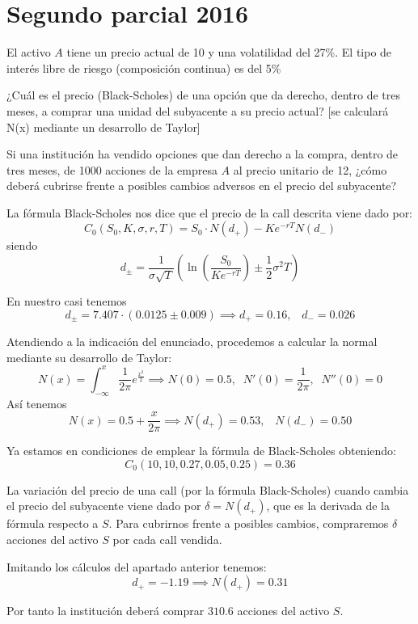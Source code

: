 \section{Segundo parcial 2016}
\begin{problem}[1]
El activo $A$ tiene un precio actual de 10 y una volatilidad del 27\%. El tipo de interés libre de riesgo (composición continua) es del 5\%

\ppart ¿Cuál es el precio (Black-Scholes) de una opción que da derecho, dentro de tres meses, a comprar una unidad del subyacente a su precio actual? [se calculará N(x) mediante un desarrollo de Taylor]

\ppart Si una institución ha vendido opciones que dan derecho a la compra, dentro de tres meses, de 1000 acciones de la empresa $A$ al precio unitario de 12, ¿cómo deberá cubrirse frente a posibles cambios adversos en el precio del subyacente?
\solution
{}

\spart

La fórmula Black-Scholes nos dice que el precio de la call descrita viene dado por:
\[C_0(S_0,K,σ,r,T) = S_0\cdot N(d_+)-Ke^{-rT}N(d_-) \]
siendo
\[d_{\pm} = \frac{1}{σ\sqrt{T}}\left(\ln\left(\frac{S_0}{Ke^{-rT}}  \right) \pm \frac{1}{2}σ^2T\right)\]

En nuestro casi tenemos
\[d_{\pm} = 7.407 \cdot \left( 0.0125 \pm 0.009\right) \implies d_+ = 0.16, \;\;\; d_- = 0.026\]

Atendiendo a la indicación del enunciado, procedemos a calcular la normal mediante su desarrollo de Taylor:
\[N(x) = \int_{-\infty}^x\frac{1}{2π}e^{\frac{x^2}{2}}\implies N(0)=0.5, \;\; N'(0) = \frac{1}{2π}, \;\; N''(0) = 0\]
Así tenemos
\[N(x) = 0.5 + \frac{x}{2π}\implies N(d_+) = 0.53, \;\;\; N(d_-) = 0.50\]

Ya estamos en condiciones de emplear la fórmula de Black-Scholes obteniendo:
\[C_0(10,10,0.27,0.05,0.25) = 0.36\]

\spart
La variación del precio de una call (por la fórmula Black-Scholes) cuando cambia el precio del subyacente viene dado por $δ=N(d_+)$, que es la derivada de la fórmula respecto a $S$. Para cubrirnos frente a posibles cambios, compraremos $δ$ acciones del activo $S$ por cada call vendida.

Imitando los cálculos del apartado anterior tenemos:
\[d_+ = -1.19 \implies N(d_+) = 0.31\]

Por tanto la institución deberá comprar $310.6$ acciones del activo $S$.
\end{problem}


